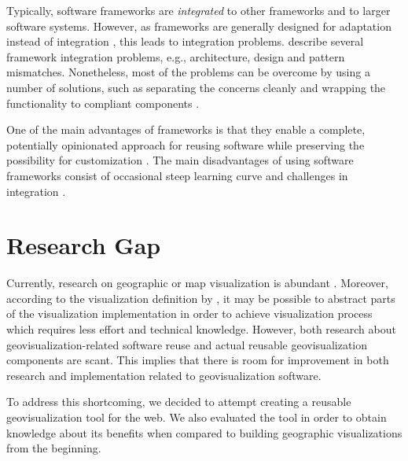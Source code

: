 Typically, software frameworks are \emph{integrated} to other frameworks and to larger software systems. However, as frameworks are generally designed for adaptation instead of integration \citep{mattsson_framework_1999}, this leads to integration problems. \citet{mattsson_framework_1999} describe several framework integration problems, e.g., architecture, design and pattern mismatches. Nonetheless, most of the problems can be overcome by using a number of solutions, such as separating the concerns cleanly and wrapping the functionality to compliant components \citep{mattsson_framework_1999}.

One of the main advantages of frameworks is that they enable a complete, potentially opinionated approach for reusing software while preserving the possibility for customization \citep{johnson_frameworkscomponents+_1997}. The main disadvantages of using software frameworks consist of occasional steep learning curve and challenges in integration \citep{fayad_object-oriented_1997}.

\chapter{Research Gap}
\label{chapter:researchgap}

Currently, research on geographic or map visualization is abundant . Moreover, according to the visualization definition by \citet{kosara_visualization_2007}, it may be possible to abstract parts of the visualization implementation in order to achieve visualization process which requires less effort and technical knowledge. However, both research about geovisualization-related software reuse and actual reusable geovisualization components are scant. This implies that there is room for improvement in both research and implementation related to geovisualization software.

To address this shortcoming, we decided to attempt creating a reusable geovisualization tool for the web. We also evaluated the tool in order to obtain knowledge about its benefits when compared to building geographic visualizations from the beginning.

